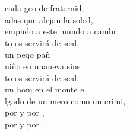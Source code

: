 \begin{cancion}
	cada geo de fraternid,\\
	adas que alejan la soled,\\
	empudo a este mundo a cambr.\\
	\jump
	to os servirá de seal, \\
	un peqo pañ\\
	niño en unaueva sins\\
	to os servirá de seal, \\
	un hom en el monte e\\
	lgado de un mero como un crimi,\\
	por  y por , \\
	por  y por .   \\
\end{cancion}%
